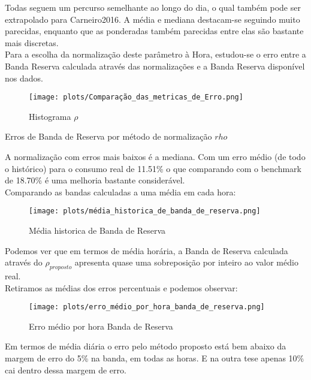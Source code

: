 Todas seguem um percurso semelhante ao longo do dia, o qual também pode ser extrapolado para Carneiro2016. A média e mediana destacam-se seguindo muito parecidas, enquanto que as ponderadas também parecidas entre elas são bastante mais discretas. \\
Para a escolha da normalização deste parâmetro à Hora, estudou-se o erro entre a Banda Reserva calculada através das normalizações e a Banda Reserva disponível nos dados. \\


\begin{figure}[H]
    \centering
    \texttt{[image: plots/Comparação\_das\_metricas\_de\_Erro.png]}
    \caption{Histograma $\rho$}
\end{figure}


\begin{table}[H]
    \caption{Erros de Banda de Reserva por método de normalização $rho$}    
    \resizebox{\linewidth}{!}{}
    \end{table}


A normalização com erros mais baixos é a mediana. Com um erro médio (de todo o histórico) para o consumo real de 11.51\% o que comparando com o benchmark de 18.70\% é uma melhoria  bastante considerável. \\
Comparando as bandas calculadas a uma média em cada hora: \\


\begin{figure}[H]
    \centering
    \texttt{[image: plots/média\_historica\_de\_banda\_de\_reserva.png]}
    \caption{Média historica de Banda de Reserva}
\end{figure}

Podemos ver que em termos de média horária, a Banda de Reserva calculada através do $\rho_{proposto}$ apresenta quase uma sobreposição por inteiro ao valor médio real. \\

Retiramos as médias dos erros percentuais e podemos observar: \\

\begin{figure}[H]
    \centering
    \texttt{[image: plots/erro\_médio\_por\_hora\_banda\_de\_reserva.png]}
    \caption{Erro médio por hora Banda de Reserva}
\end{figure}

Em termos de média diária o erro pelo método proposto está bem abaixo da margem de erro do 5\% na banda, em todas as horas. E na outra tese apenas 10\% cai dentro dessa margem de erro. \\

